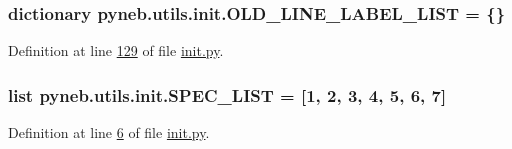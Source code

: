 \subsubsection[{O\+L\+D\+\_\+\+L\+I\+N\+E\+\_\+\+L\+A\+B\+E\+L\+\_\+\+L\+I\+S\+T}]{\setlength{\rightskip}{0pt plus 5cm}dictionary pyneb.\+utils.\+init.\+O\+L\+D\+\_\+\+L\+I\+N\+E\+\_\+\+L\+A\+B\+E\+L\+\_\+\+L\+I\+S\+T = \{\}}\label{namespacepyneb_1_1utils_1_1init_aae3ff006599d45be21cb0b2753f14802}


Definition at line \hyperlink{init_8py_source_l00129}{129} of file \hyperlink{init_8py_source}{init.\+py}.

\hypertarget{namespacepyneb_1_1utils_1_1init_afd0ab6834d14e36c7ba2bfa6fdfbd386}{}
\subsubsection[{S\+P\+E\+C\+\_\+\+L\+I\+S\+T}]{\setlength{\rightskip}{0pt plus 5cm}list pyneb.\+utils.\+init.\+S\+P\+E\+C\+\_\+\+L\+I\+S\+T = \mbox{[}\textquotesingle{}1\textquotesingle{}, \textquotesingle{}2\textquotesingle{}, \textquotesingle{}3\textquotesingle{}, \textquotesingle{}4\textquotesingle{}, \textquotesingle{}5\textquotesingle{}, \textquotesingle{}6\textquotesingle{}, \textquotesingle{}7\textquotesingle{}\mbox{]}}\label{namespacepyneb_1_1utils_1_1init_afd0ab6834d14e36c7ba2bfa6fdfbd386}


Definition at line \hyperlink{init_8py_source_l00006}{6} of file \hyperlink{init_8py_source}{init.\+py}.

